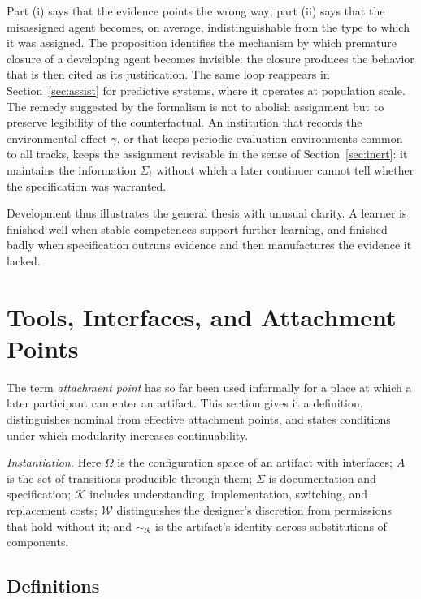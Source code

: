 Part (i) says that the evidence points the wrong way; part (ii) says that the misassigned agent becomes, on average, indistinguishable from the type to which it was assigned. The proposition identifies the mechanism by which premature closure of a developing agent becomes invisible: the closure produces the behavior that is then cited as its justification. The same loop reappears in Section~\ref{sec:assist} for predictive systems, where it operates at population scale. The remedy suggested by the formalism is not to abolish assignment but to preserve legibility of the counterfactual. An institution that records the environmental effect $\gamma$, or that keeps periodic evaluation environments common to all tracks, keeps the assignment revisable in the sense of Section~\ref{sec:inert}: it maintains the information $\Sigma_t$ without which a later continuer cannot tell whether the specification was warranted.

Development thus illustrates the general thesis with unusual clarity. A learner is finished well when stable competences support further learning, and finished badly when specification outruns evidence and then manufactures the evidence it lacked.

\section{Tools, Interfaces, and Attachment Points}\label{sec:attachment}

The term \emph{attachment point} has so far been used informally for a place at which a later participant can enter an artifact. This section gives it a definition, distinguishes nominal from effective attachment points, and states conditions under which modularity increases continuability.

\emph{Instantiation.} Here $\Omega$ is the configuration space of an artifact with interfaces; $A$ is the set of transitions producible through them; $\Sigma$ is documentation and specification; $\mathcal{K}$ includes understanding, implementation, switching, and replacement costs; $\mathcal{W}$ distinguishes the designer's discretion from permissions that hold without it; and $\sim_{\mathcal{R}}$ is the artifact's identity across substitutions of components.

\subsection{Definitions}

